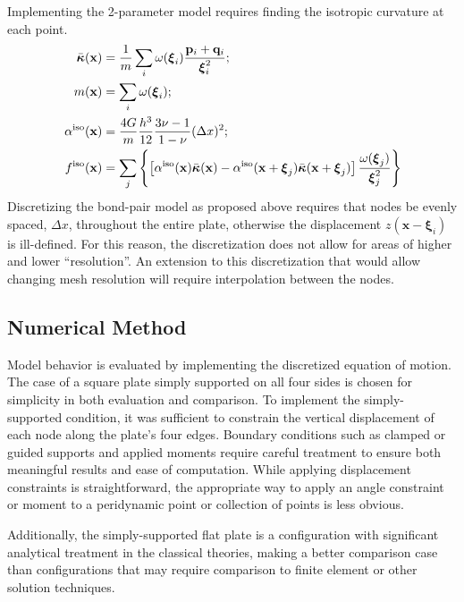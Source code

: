 \documentclass[preprint,review,12pt]{elsarticle}
\begin{document}
Implementing the 2-parameter model requires finding the isotropic curvature at each point.
%
\begin{align*}
    \bar{\boldsymbol{\kappa}}(\mathbf{x}) &= \frac{1}{m} \sum_i \omega(\boldsymbol{\xi}_i)\frac{\mathbf{p}_i +\mathbf{q}_i }{\boldsymbol{\xi}_i^2};\notag \\
    m(\mathbf{x})  &= \sum_i \omega(\boldsymbol{\xi}_i); \notag \\
    \alpha^\text{iso}(\mathbf{x}) &= \frac{4G}{m}\frac{h^3}{12}\frac{3\nu-1}{1-\nu}(\Delta x)^2;\\
    f^\text{iso}(\mathbf{x}) &= \sum_j \left\{\left[\alpha^\text{iso}(\mathbf{x})\bar{\boldsymbol{\kappa}}(\mathbf{x})-\alpha^\text{iso}(\mathbf{x}+\boldsymbol{\xi}_j)\bar{\boldsymbol{\kappa}}(\mathbf{x}+\boldsymbol{\xi}_j) \right] \frac{\omega(\boldsymbol{\xi}_j)}{\boldsymbol{\xi}_j^2} \right\}
\end{align*}
%
Discretizing the bond-pair model as proposed above requires that nodes be evenly spaced, $\Delta x$, throughout the entire plate, otherwise the displacement \(z(\mathbf{x}-\boldsymbol{\xi}_i)\) is ill-defined.  For this reason, the discretization does not allow for areas of higher and lower ``resolution''. An extension to this discretization that would allow changing mesh resolution will require interpolation between the nodes.  
%
\subsection{Numerical Method}
\label{sec:NumMethod}
Model behavior is evaluated by implementing the discretized equation of motion.  The case of a square plate simply supported on all four sides is chosen for simplicity in both evaluation and comparison.  To implement the simply-supported condition, it was sufficient to constrain the vertical displacement of each node along the plate's four edges.  Boundary conditions such as clamped or guided supports and applied moments require careful treatment to ensure both meaningful results and ease of computation.  While applying displacement constraints is straightforward, the appropriate way to apply an angle constraint or moment to a peridynamic point or collection of points is less obvious.

Additionally, the simply-supported flat plate is a configuration with significant analytical treatment in the classical theories, making a better comparison case than configurations that may require comparison to finite element or other solution techniques.
%
\end{document}
